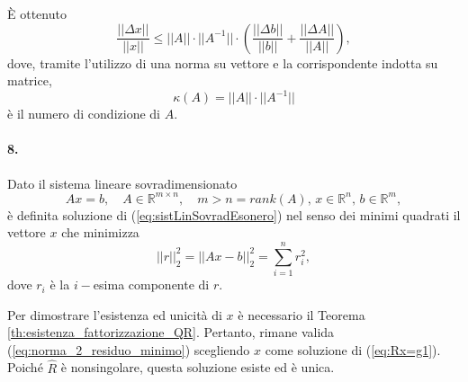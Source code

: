 È ottenuto
\begin{equation*}
    \frac{||\Delta x||}{||x||}\leq ||A||\cdot||A^{-1}||\cdot\left(\frac{||\Delta b||}{||b||} + \frac{||\Delta A||}{||A||}\right),
\end{equation*}
dove, tramite l'utilizzo di una norma su vettore e la corrispondente indotta su matrice,
\begin{equation*}
    \kappa(A)=||A||\cdot ||A^{-1}||
\end{equation*}
è il numero di condizione di $A$.

\paragraph{8.} Dato il sistema lineare sovradimensionato
\begin{equation}\label{eq:sistLinSovradEsonero}
    Ax=b,\quad A\in\mathbb R^{m\times n},\quad m>n=rank(A),\, x\in\mathbb R^n,\, b\in\mathbb R^m,
\end{equation}
è definita soluzione di (\ref{eq:sistLinSovradEsonero}) nel senso dei minimi quadrati il vettore $x$ che minimizza
\begin{equation*}
    ||r||_2^2=||Ax-b||_2^2=\sum_{i=1}^nr_i^2,
\end{equation*}
dove $r_i$ è la $i-$esima componente di $r$.

\noindent Per dimostrare l'esistenza ed unicità di $x$ è necessario il Teorema \ref{th:esistenza_fattorizzazione_QR}. Pertanto, rimane valida (\ref{eq:norma_2_residuo_minimo}) scegliendo $x$ come soluzione di (\ref{eq:Rx=g1}). Poiché $\widehat R$ è nonsingolare, questa soluzione esiste ed è unica.
